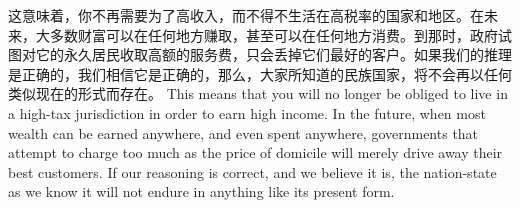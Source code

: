 \begin{paracol}{2}[]
\switchcolumn*
这意味着，你不再需要为了高收入，而不得不生活在高税率的国家和地区。在未来，大多数财富可以在任何地方赚取，甚至可以在任何地方消费。到那时，政府试图对它的永久居民收取高额的服务费，只会丢掉它们最好的客户。如果我们的推理是正确的，我们相信它是正确的，那么，大家所知道的民族国家，将不会再以任何类似现在的形式而存在。
\switchcolumn
This means that you will no longer be obliged to live in a high-tax jurisdiction in order to earn high income. In the future, when most wealth can be earned anywhere, and even spent anywhere, governments that attempt to charge too much as the price of domicile will merely drive away their best customers. If our reasoning is correct, and we believe it is, the nation-state as we know it will not endure in anything like its present form.
\end{paracol}

